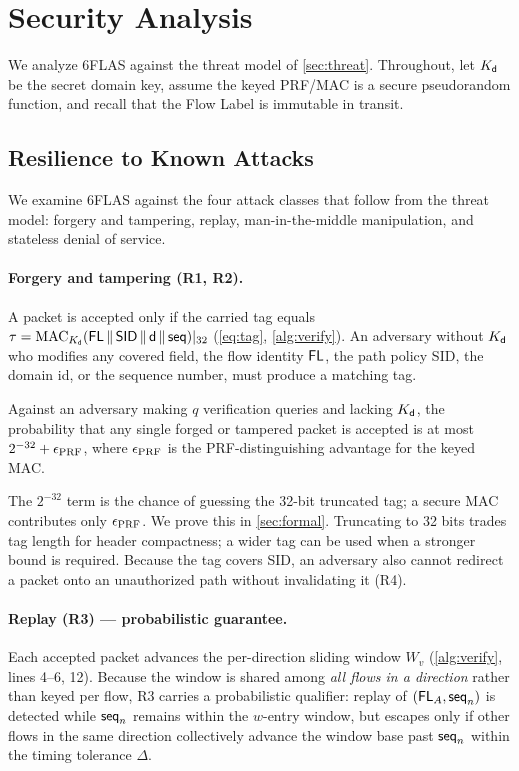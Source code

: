 \section{Security Analysis}
\label{sec:security}

We analyze 6FLAS against the threat model of \cref{sec:threat}. Throughout, let
$K_{\mathsf{d}}$ be the secret domain key, assume the keyed PRF/MAC is a secure
pseudorandom function, and recall that the Flow Label is immutable in transit.

\subsection{Resilience to Known Attacks}
\label{sec:attacks}

We examine 6FLAS against the four attack classes that follow from the
threat model: forgery and tampering, replay, man-in-the-middle
manipulation, and stateless denial of service. 

\paragraph{Forgery and tampering (R1, R2).}
A packet is accepted only if the carried tag equals
$\tau=\operatorname{MAC}_{K_{\mathsf{d}}}(\mathsf{FL}\,\|\,\textsf{SID}\,\|\,\mathsf{d}\,\|\,\mathsf{seq})|_{32}$
(\cref{eq:tag}, \cref{alg:verify}). An adversary without $K_{\mathsf{d}}$ who
modifies any covered field, the flow identity $\mathsf{FL}$, the path policy
\textsf{SID}, the domain id, or the sequence number, must produce a matching
tag.

\begin{proposition}
\label{prop:forgery}
Against an adversary making $q$ verification queries and lacking $K_{\mathsf{d}}$,
the probability that any single forged or tampered packet is accepted is at most
$2^{-32}+\epsilon_{\operatorname{PRF}}$, where $\epsilon_{\operatorname{PRF}}$ is the PRF-distinguishing
advantage for the keyed MAC.
\end{proposition}

The $2^{-32}$ term is the chance of guessing the 32-bit truncated tag; a secure
MAC contributes only $\epsilon_{\operatorname{PRF}}$. We prove this in \cref{sec:formal}.
Truncating to 32 bits trades tag length for header
compactness; a wider tag can be used when a stronger bound is required. Because the tag covers \textsf{SID}, an adversary also cannot
redirect a packet onto an unauthorized path without invalidating it (R4).

\paragraph{Replay (R3) — probabilistic guarantee.}
Each accepted packet advances the per-direction sliding window $W_v$
(\cref{alg:verify}, lines 4--6, 12). Because the window is shared among
\emph{all flows in a direction} rather than keyed per flow, R3 carries a
probabilistic qualifier: replay of $(\mathsf{FL}_A, \mathsf{seq}_n)$ is detected while
$\mathsf{seq}_n$ remains within the $w$-entry window, but escapes only if other flows
in the same direction collectively advance the window base past $\mathsf{seq}_n$ within
the timing tolerance $\Delta$.

